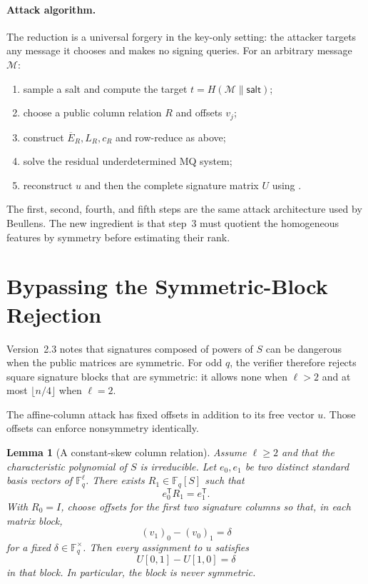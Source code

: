 \documentclass[11pt]{article}
\newtheorem{lemma}[theorem]{Lemma}
\newcommand{\F}{\mathbb F}
\newcommand{\transpose}{\mathsf T}
\begin{document}
\paragraph{Attack algorithm.}
The reduction is a universal forgery in the key-only setting: the attacker targets any message it chooses and makes no signing queries.  For an arbitrary message $\mathcal M$:
\begin{enumerate}
\item sample a salt and compute the target $t=H(\mathcal M\|\textsf{salt})$;
\item choose a public column relation $R$ and offsets $v_j$;
\item construct $\overline E_R,L_R,c_R$ and row-reduce as above;
\item solve the residual underdetermined MQ system;
\item reconstruct $u$ and then the complete signature matrix $U$ using .
\end{enumerate}
The first, second, fourth, and fifth steps are the same attack architecture used by Beullens.  The new ingredient is that step~3 must quotient the homogeneous features by symmetry before estimating their rank.

\section{Bypassing the Symmetric-Block Rejection}\label{sec:rejection}

Version~2.3 notes that signatures composed of powers of $S$ can be dangerous when the public matrices are symmetric.  For odd $q$, the verifier therefore rejects square signature blocks that are symmetric: it allows none when $\ell>2$ and at most $\lfloor n/4\rfloor$ when $\ell=2$.

The affine-column attack has fixed offsets in addition to its free vector $u$.  Those offsets can enforce nonsymmetry identically.

\begin{lemma}[A constant-skew column relation]\label{lem:skew}
Assume $\ell\ge2$ and that the characteristic polynomial of $S$ is irreducible.  Let $e_0,e_1$ be two distinct standard basis vectors of $\F_q^\ell$.  There exists $R_1\in\F_q[S]$ such that
\[
 e_0^\transpose R_1=e_1^\transpose.
\]
With $R_0=I$, choose offsets for the first two signature columns so that, in each matrix block,
\[
 (v_1)_0-(v_0)_1=\delta
\]
for a fixed $\delta\in\F_q^\times$.  Then every assignment to $u$ satisfies
\[
 U[0,1]-U[1,0]=\delta
\]
in that block.  In particular, the block is never symmetric.
\end{lemma}
\end{document}
